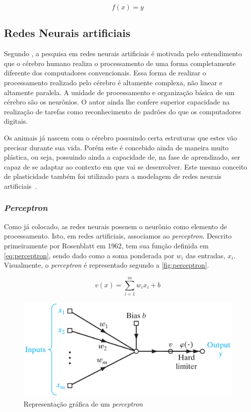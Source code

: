 \documentclass[
    12pt,
    oneside,
    a4paper,
    english,
    brazil
]{abntex2}
\begin{document}
\begin{equation}
    \label{eq:sisCla}
    f(x) = \hat{y}
\end{equation}

\subsection{Redes Neurais artificiais}

Segundo  , a pesquisa  em  redes  neurais artificiais  é
motivada pelo entendimento que o cérebro  humano realiza o processamento de uma
forma  completamente diferente  dos computadores  convencionais. Essa  forma de
realizar  o processamento  realizado  pelo cérebro  é  altamente complexa,  não
linear e altamente paralela. A unidade de processamento e organização básica de
um cérebro são  os neurônios. O autor ainda lhe  confere superior capacidade na
realização de  tarefas como  reconhecimento de padrões  do que  os computadores
digitais.

Os animais  já nascem com  o cérebro possuindo  certa estruturas que  estes vão
precisar  durante sua  vida.  Porém este  é concebido  ainda  de maneira  muito
plástica, ou seja, possuindo ainda a capacidade de, na fase de aprendizado, ser
capaz de se adaptar ao contexto em  que vai se desenvolver. Este mesmo conceito
de  plasticidade  também  foi  utilizado  para a  modelagem  de  redes  neurais
artificiais~\cite{haykin2009}.

\subsubsection{\textit{Perceptron}}

Como  já  colocado, as  redes  neurais  possuem  o  neurônio como  elemento  de
processamento. Isto,  em redes artificiais, associamos  ao \textit{perceptron}.
Descrito  primeiramente por  Rosenblatt em  1962,  tem sua  função definida  em
\autoref{eq:perceptron},  sendo  dado  como  a soma  ponderada  por  $w_i$  das
entradas, $x_i$.  Visualmente, o  \textit{perceptron} é representado  segundo a
\autoref{fig:perceptron}.

\begin{equation}\label{eq:perceptron}
    v(x) = \sum_{i=1}^{m}{w_i  x_i + b}
\end{equation}

\begin{figure}[ht]
    \centering
    \caption{Representação gráfica de um \textit{perceptron}}\label{fig:perceptron}
    \includegraphics[width=.5\linewidth]{images/perceptron.png}
\end{figure}
\end{document}
